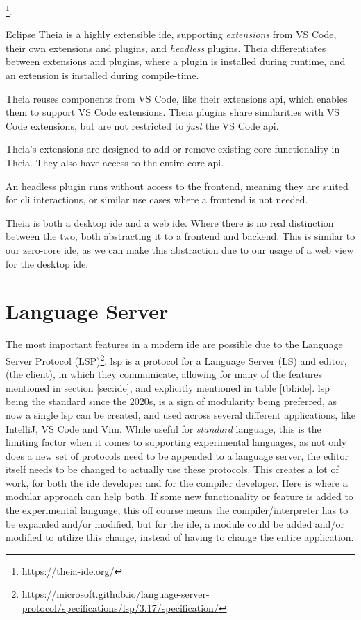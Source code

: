 \footnote{\url{https://theia-ide.org/}}.

Eclipse Theia is a highly extensible \gls*{ide}, supporting \textit{extensions}
from VS Code, their own extensions and plugins, and \textit{headless} plugins.
Theia differentiates between extensions and plugins, where a plugin is installed
during runtime, and an extension is installed during compile-time.

Theia reuses components from VS Code, like their extensions \gls*{api}, which
enables them to support VS Code extensions. Theia plugins share similarities
with VS Code extensions, but are not restricted to \textit{just} the VS Code
\gls*{api}.

Theia's extensions are designed to add or remove existing core functionality in
Theia. They also have access to the entire core \gls*{api}.

An headless plugin runs without access to the frontend, meaning they are suited
for \gls*{cli} interactions, or similar use cases where a frontend is not
needed.

Theia is both a desktop \gls*{ide} and a web \gls*{ide}. Where there is no real
distinction between the two, both abstracting it to a frontend and backend. This
is similar to our zero-core \gls*{ide}, as we can make this abstraction due to
our usage of a web view for the desktop \gls*{ide}.


\section{Language Server} \label{sec:lsp}

The most important features in a modern \gls*{ide} are possible due to the
Language Server Protocol (LSP)\footnote{\url{https://microsoft.github.io/language-server-protocol/specifications/lsp/3.17/specification/}}.
\gls*{lsp} is a protocol for a Language Server (LS) and editor, (the client), in
which they communicate, allowing for many of the features mentioned in section
\ref{sec:ide}, and explicitly mentioned in table \ref{tbl:ide}. \gls*{lsp} being
the standard since the 2020s, is a sign of modularity being preferred, as now a
single \gls*{lsp} can be created, and used across several different
applications, like IntelliJ, VS Code and Vim. While useful for
\textit{standard} language, this is the limiting factor when it comes to
supporting experimental languages, as not only does a new set of protocols need
to be appended to a language server, the editor itself needs to be changed to
actually use these protocols. This creates a lot of work, for both the
\gls*{ide} developer and for the compiler developer. Here is where a modular
approach can help both. If some new functionality or feature is added to the
experimental language, this off course means the compiler/interpreter has to be
expanded and/or modified, but for the \gls*{ide}, a module could be added and/or
modified to utilize this change, instead of having to change the entire
application.

